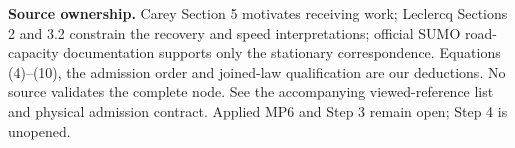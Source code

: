 \documentclass[11pt,a4paper]{article}
\begin{document}
\textbf{Source ownership.} Carey Section 5 motivates receiving work;
Leclercq Sections 2 and 3.2 constrain the recovery and speed interpretations;
official SUMO road-capacity documentation supports only the stationary
correspondence. Equations (4)--(10), the admission order and joined-law
qualification are our deductions. No source validates the complete node.
See the accompanying viewed-reference list and physical admission contract.
Applied MP6 and Step 3 remain open; Step 4 is unopened.
\end{document}
